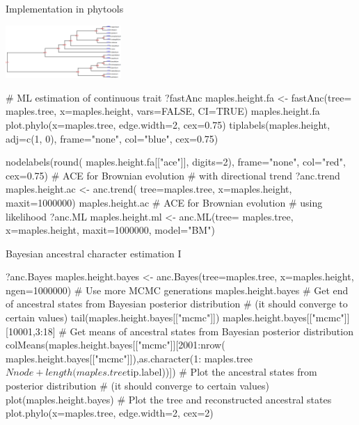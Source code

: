 \documentclass[compress, xelatex, 11pt, xcolor=svgnames, aspectratio=169,
	hyperref={
		bookmarks=true,
		unicode=true,
		colorlinks=true,
		pdftitle={Molecular data in R},
		plainpages=false,
		pdfauthor={Vojtech Zeisek},
		pdfsubject={Course about phylogeny and evolution in R},
		pdfcreator={XeLaTeX},
		pdfkeywords={R, evolution, phylogeny, molecular data},
		linkcolor=Crimson, %
		anchorcolor=Magenta, %
		citecolor=Magenta, %
		filecolor=Magenta, %
		menucolor=Magenta, %
		urlcolor=DodgerBlue, %
		},
	url={hyphens, lowtilde} %
	]{beamer}
\begin{document}
\begin{frame}[fragile]{Implementation in phytools}
	\begin{multicols}{2}
		\vfill
		\begin{center}
			\includegraphics[height=2cm]{ancml.png}
		\end{center}
		\begin{spluscode}
    # ML estimation of continuous trait
    ?fastAnc
    maples.height.fa <- fastAnc(tree=
      maples.tree, x=maples.height,
      vars=FALSE, CI=TRUE)
    maples.height.fa
    plot.phylo(x=maples.tree,
      edge.width=2, cex=0.75)
    tiplabels(maples.height,
      adj=c(1, 0), frame="none",
      col="blue", cex=0.75)
		\end{spluscode}
		\vfill
		\columnbreak
		\begin{spluscode}
    nodelabels(round(
      maples.height.fa[["ace"]],
      digits=2), frame="none",
      col="red", cex=0.75)
    # ACE for Brownian evolution
    # with directional trend
    ?anc.trend
    maples.height.ac <- anc.trend(
      tree=maples.tree,
      x=maples.height, maxit=1000000)
    maples.height.ac
    # ACE for Brownian evolution
    # using likelihood
    ?anc.ML
    maples.height.ml <- anc.ML(tree=
      maples.tree, x=maples.height,
      maxit=1000000, model="BM")
		\end{spluscode}
	\end{multicols}
\end{frame}

\begin{frame}[fragile]{Bayesian ancestral character estimation I}
	\begin{spluscode}
    ?anc.Bayes
    maples.height.bayes <- anc.Bayes(tree=maples.tree, x=maples.height,
      ngen=1000000) # Use more MCMC generations
    maples.height.bayes
    # Get end of ancestral states from Bayesian posterior distribution
    # (it should converge to certain values)
    tail(maples.height.bayes[["mcmc"]])
    maples.height.bayes[["mcmc"]][10001,3:18]
    # Get means of ancestral states from Bayesian posterior distribution
    colMeans(maples.height.bayes[["mcmc"]][2001:nrow(
      maples.height.bayes[["mcmc"]]),as.character(1:
      maples.tree$Nnode+length(maples.tree$tip.label))])
    # Plot the ancestral states from posterior distribution
    # (it should converge to certain values)
    plot(maples.height.bayes)
    # Plot the tree and reconstructed ancestral states
    plot.phylo(x=maples.tree, edge.width=2, cex=2)
	\end{spluscode}
\end{frame}
\end{document}
